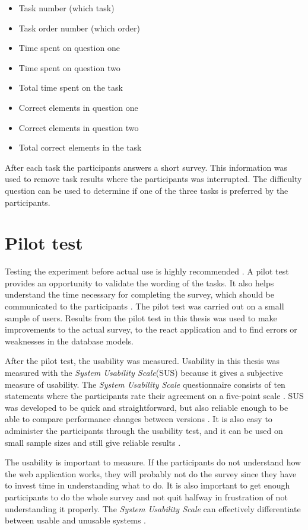 \begin{itemize}
	\item Task number (which task)
	\item Task order number (which order)
	\item Time spent on question one 
	\item Time spent on question two
	\item Total time spent on the task
	\item Correct elements in question one
	\item Correct elements in question two
	\item Total correct elements in the task
\end{itemize}
\vspace{0.2cm}

After each task the participants answers a short survey. This information was used to remove task results where the participants was interrupted. The difficulty question can be used to determine if one of the three tasks is preferred by the participants. 

\section{Pilot test}
Testing the experiment before actual use is highly recommended \citep{Ben2009}. A pilot test provides an opportunity to validate the wording of the tasks. It also helps understand the time necessary for completing the survey, which should be communicated to the participants \citep{Schade2015}. The pilot test was carried out on a small sample of users. Results from the pilot test in this thesis was used to make improvements to the actual survey, to the react application and to find errors or weaknesses in the database models.

After the pilot test, the usability was measured. Usability in this thesis was measured with the \textit{System Usability Scale}(SUS) because it gives a subjective measure of usability. The \textit{System Usability Scale} questionnaire consists of ten statements where the participants rate their agreement on a five-point scale \citep{Ben2009}. SUS was developed to be quick and straightforward, but also reliable enough to be able to compare performance changes between versions \citep{Brooke1996}. It is also easy to administer the participants through the usability test, and it can be used on small sample sizes and still give reliable results \citep{Affairs2013}.  

The usability is important to measure. If the participants do not understand how the web application works, they will probably not do the survey since they have to invest time in understanding what to do. %
It is also important to get enough participants to do the whole survey and not quit halfway in frustration of not understanding it properly. The \textit{System Usability Scale} can effectively differentiate between usable and unusable systems \citep{Affairs2013}. 

